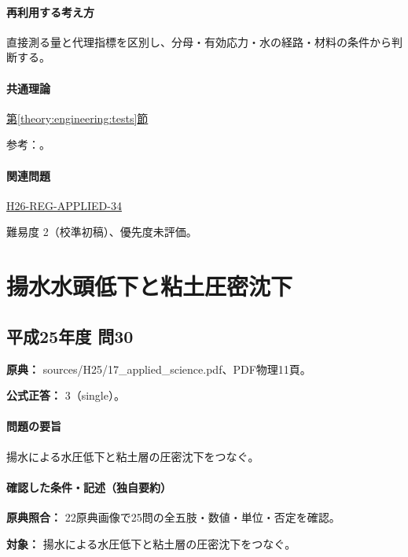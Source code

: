 \paragraph{再利用する考え方} 直接測る量と代理指標を区別し、分母・有効応力・水の経路・材料の条件から判断する。

\paragraph{共通理論} \hyperref[theory:engineering:tests]{第\ref*{theory:engineering:tests}節}

\par 参考：\cite{eng52_geotech_tests,eng52_consolidation}。

\paragraph{関連問題} \hyperref[q:h26-reg-applied-34]{H26-REG-APPLIED-34}

\par 難易度 2（校準初稿）、優先度未評価。

\section{揚水水頭低下と粘土圧密沈下}

\subsection{平成25年度 問30}
\label{q:h25-reg-applied-30}

\noindent\textbf{原典：} sources/H25/17\_applied\_science.pdf、PDF物理11頁。

\textbf{公式正答：} 3（single）。

\paragraph{問題の要旨} 揚水による水圧低下と粘土層の圧密沈下をつなぐ。

\paragraph{確認した条件・記述（独自要約）}\mbox{}\par

\noindent\textbf{原典照合：} 22原典画像で25問の全五肢・数値・単位・否定を確認。\par

\noindent\textbf{対象：} 揚水による水圧低下と粘土層の圧密沈下をつなぐ。\par

